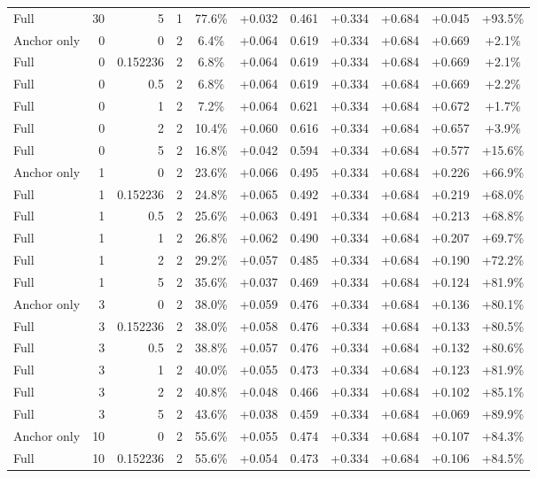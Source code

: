 \begin{table}[htbp]
\begin{tabular}{lrrrccccccc}
Full & 30 & 5 & 1 & 77.6\% & +0.032 & 0.461 & +0.334 & +0.684 & +0.045 & +93.5\% \\
Anchor only & 0 & 0 & 2 & 6.4\% & +0.064 & 0.619 & +0.334 & +0.684 & +0.669 & +2.1\% \\
Full & 0 & 0.152236 & 2 & 6.8\% & +0.064 & 0.619 & +0.334 & +0.684 & +0.669 & +2.1\% \\
Full & 0 & 0.5 & 2 & 6.8\% & +0.064 & 0.619 & +0.334 & +0.684 & +0.669 & +2.2\% \\
Full & 0 & 1 & 2 & 7.2\% & +0.064 & 0.621 & +0.334 & +0.684 & +0.672 & +1.7\% \\
Full & 0 & 2 & 2 & 10.4\% & +0.060 & 0.616 & +0.334 & +0.684 & +0.657 & +3.9\% \\
Full & 0 & 5 & 2 & 16.8\% & +0.042 & 0.594 & +0.334 & +0.684 & +0.577 & +15.6\% \\
Anchor only & 1 & 0 & 2 & 23.6\% & +0.066 & 0.495 & +0.334 & +0.684 & +0.226 & +66.9\% \\
Full & 1 & 0.152236 & 2 & 24.8\% & +0.065 & 0.492 & +0.334 & +0.684 & +0.219 & +68.0\% \\
Full & 1 & 0.5 & 2 & 25.6\% & +0.063 & 0.491 & +0.334 & +0.684 & +0.213 & +68.8\% \\
Full & 1 & 1 & 2 & 26.8\% & +0.062 & 0.490 & +0.334 & +0.684 & +0.207 & +69.7\% \\
Full & 1 & 2 & 2 & 29.2\% & +0.057 & 0.485 & +0.334 & +0.684 & +0.190 & +72.2\% \\
Full & 1 & 5 & 2 & 35.6\% & +0.037 & 0.469 & +0.334 & +0.684 & +0.124 & +81.9\% \\
Anchor only & 3 & 0 & 2 & 38.0\% & +0.059 & 0.476 & +0.334 & +0.684 & +0.136 & +80.1\% \\
Full & 3 & 0.152236 & 2 & 38.0\% & +0.058 & 0.476 & +0.334 & +0.684 & +0.133 & +80.5\% \\
Full & 3 & 0.5 & 2 & 38.8\% & +0.057 & 0.476 & +0.334 & +0.684 & +0.132 & +80.6\% \\
Full & 3 & 1 & 2 & 40.0\% & +0.055 & 0.473 & +0.334 & +0.684 & +0.123 & +81.9\% \\
Full & 3 & 2 & 2 & 40.8\% & +0.048 & 0.466 & +0.334 & +0.684 & +0.102 & +85.1\% \\
Full & 3 & 5 & 2 & 43.6\% & +0.038 & 0.459 & +0.334 & +0.684 & +0.069 & +89.9\% \\
Anchor only & 10 & 0 & 2 & 55.6\% & +0.055 & 0.474 & +0.334 & +0.684 & +0.107 & +84.3\% \\
Full & 10 & 0.152236 & 2 & 55.6\% & +0.054 & 0.473 & +0.334 & +0.684 & +0.106 & +84.5\% \\

\end{tabular}
\end{table}
